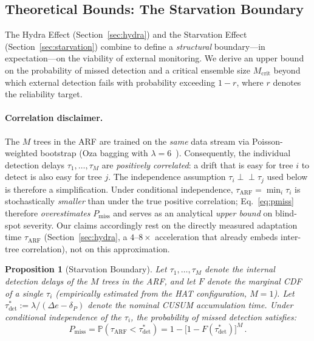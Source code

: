 \documentclass[10pt,conference]{IEEEtran}
\newtheorem{proposition}[theorem]{Proposition}
\theoremstyle{definition}
\begin{document}
\subsection{Theoretical Bounds: The Starvation Boundary}\label{sec:starvation_boundary}

The Hydra Effect (Section~\ref{sec:hydra}) and the Starvation Effect (Section~\ref{sec:starvation}) combine to define a \emph{structural} boundary---in expectation---on the viability of external monitoring.
We derive an upper bound on the probability of missed detection and a critical ensemble size $M_{\mathrm{crit}}$ beyond which external detection fails with probability exceeding $1 - r$, where $r$ denotes the reliability target.

\paragraph{Correlation disclaimer.}
The $M$ trees in the ARF are trained on the \emph{same} data stream via Poisson-weighted bootstrap (Oza bagging with $\lambda = 6$~\cite{gomes_arf_2017}).
Consequently, the individual detection delays $\tau_1, \ldots, \tau_M$ are \emph{positively correlated}: a drift that is easy for tree $i$ to detect is also easy for tree $j$.
The independence assumption $\tau_i \perp\!\!\!\perp \tau_j$ used below is therefore a simplification.
Under conditional independence, $\tau_{\mathrm{ARF}} = \min_i \tau_i$ is stochastically \emph{smaller} than under the true positive correlation; Eq.~\eqref{eq:pmiss} therefore \emph{overestimates} $P_{\mathrm{miss}}$ and serves as an analytical \emph{upper bound} on blind-spot severity. Our claims accordingly rest on the directly measured adaptation time $\tau_{\mathrm{ARF}}$ (Section~\ref{sec:hydra}, a $4$--$8\times$ acceleration that already embeds inter-tree correlation), not on this approximation.

\begin{proposition}[Starvation Boundary]\label{prop:starvation_boundary}
  Let $\tau_1, \ldots, \tau_M$ denote the internal detection delays of the $M$ trees in the ARF, and let $F$ denote the marginal CDF of a single $\tau_i$ (empirically estimated from the HAT configuration, $M = 1$).
  Let $\tau_{\mathrm{det}}^* := \lambda / (\Delta e - \delta_P)$ denote the nominal CUSUM accumulation time.
  Under conditional independence of the $\tau_i$, the probability of missed detection satisfies:
  \begin{equation}\label{eq:pmiss}
    P_{\mathrm{miss}} = \mathbb{P}\!\left(\tau_{\mathrm{ARF}} < \tau_{\mathrm{det}}^*\right) = 1 - \bigl[1 - F(\tau_{\mathrm{det}}^*)\bigr]^M\,.
  \end{equation}
\end{proposition}
\end{document}
